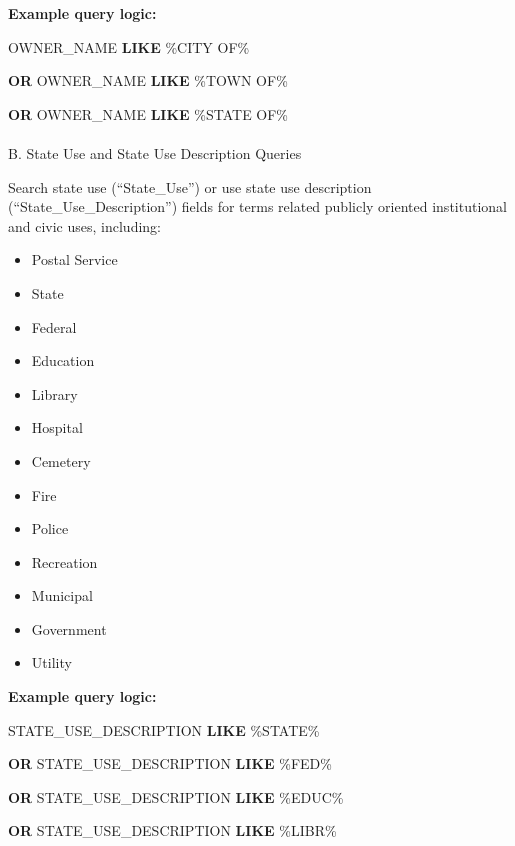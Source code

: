 \documentclass[
  letterpaper,
  DIV=11,
  numbers=noendperiod]{scrreprt}
\makeatletter
\let\oldparagraph\paragraph
\renewcommand{\paragraph}{
    \@ifstar
      \xxxParagraphStar
      \xxxParagraphNoStar
  }
\newcommand{\xxxParagraphStar}[1]{\oldparagraph*{#1}\mbox{}}
\newcommand{\xxxParagraphNoStar}[1]{\oldparagraph{#1}\mbox{}}
\newenvironment{Shaded}{\begin{snugshade}}{\end{snugshade}}
\newcommand{\KeywordTok}[1]{\textcolor[rgb]{0.00,0.23,0.31}{\textbf{#1}}}
\newcommand{\NormalTok}[1]{\textcolor[rgb]{0.00,0.23,0.31}{#1}}
\newcommand{\StringTok}[1]{\textcolor[rgb]{0.13,0.47,0.30}{#1}}
\providecommand{\tightlist}{%
  \setlength{\itemsep}{0pt}\setlength{\parskip}{0pt}}
\makeatother
\begin{document}
\textbf{Example query logic:}

\begin{Shaded}
\begin{Highlighting}[]
\NormalTok{OWNER\_NAME }\KeywordTok{LIKE} \StringTok{\textquotesingle{}\%CITY OF\%\textquotesingle{}}

\KeywordTok{OR}\NormalTok{ OWNER\_NAME }\KeywordTok{LIKE} \StringTok{\textquotesingle{}\%TOWN OF\%\textquotesingle{}}

\KeywordTok{OR}\NormalTok{ OWNER\_NAME }\KeywordTok{LIKE} \StringTok{\textquotesingle{}\%STATE OF\%\textquotesingle{}}
\end{Highlighting}
\end{Shaded}

\paragraph{B. State Use and State Use Description
Queries}\label{b.-state-use-and-state-use-description-queries}

Search state use (``State\_Use'') or use state use description
(``State\_Use\_Description'') fields for terms related publicly oriented
institutional and civic uses, including:

\begin{itemize}
\tightlist
\item
  Postal Service
\item
  State
\item
  Federal
\item
  Education
\item
  Library
\item
  Hospital
\item
  Cemetery
\item
  Fire
\item
  Police
\item
  Recreation
\item
  Municipal
\item
  Government
\item
  Utility
\end{itemize}

\textbf{Example query logic:}

\begin{Shaded}
\begin{Highlighting}[]
\NormalTok{STATE\_USE\_DESCRIPTION }\KeywordTok{LIKE} \StringTok{\textquotesingle{}\%STATE\%\textquotesingle{}}
    
\KeywordTok{OR}\NormalTok{ STATE\_USE\_DESCRIPTION }\KeywordTok{LIKE} \StringTok{\textquotesingle{}\%FED\%\textquotesingle{}}
    
\KeywordTok{OR}\NormalTok{ STATE\_USE\_DESCRIPTION }\KeywordTok{LIKE} \StringTok{\textquotesingle{}\%EDUC\%\textquotesingle{}}

\KeywordTok{OR}\NormalTok{ STATE\_USE\_DESCRIPTION }\KeywordTok{LIKE} \StringTok{\textquotesingle{}\%LIBR\%\textquotesingle{}}
\end{Highlighting}
\end{Shaded}
\end{document}
